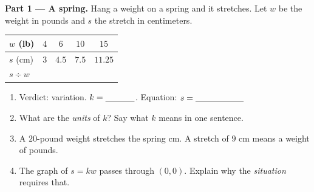 \documentclass[10pt]{article}
\begin{document}
\begin{tcolorbox}[colback=white, colframe=black!40, title=\textbf{Tier A --- Approaching Proficiency},
    fonttitle=\bfseries, arc=1.5mm, left=3mm, right=3mm, top=2mm, bottom=2mm, breakable]
\textbf{Part 1 --- A spring.} Hang a weight on a spring and it stretches. Let $w$ be the weight in
pounds and $s$ the stretch in centimeters.
\begin{center}
\renewcommand{\arraystretch}{1.3}
\begin{tabular}{|l|c|c|c|c|}
\hline
\rowcolor{forestbg}
$w$ (lb) & $4$ & $6$ & $10$ & $15$ \\ \hline
$s$ (cm) & $3$ & $4.5$ & $7.5$ & $11.25$ \\ \hline
$s\div w$ & & & & \\ \hline
\end{tabular}
\end{center}
\begin{enumerate}[label=\arabic*., leftmargin=2.1em, itemsep=5pt]
  \item Verdict: \blank{2.2cm} variation. \; $k=\blank{1.2cm}$. \; Equation: $s=\blank{2.0cm}$
  \item What are the \emph{units} of $k$? \blank{3.4cm} \; Say what $k$ means in one sentence.
        \blank{5.0cm}
  \item A $20$-pound weight stretches the spring \blank{1.6cm} cm. \; A stretch of $9$ cm means a
        weight of \blank{1.6cm} pounds.
  \item The graph of $s=kw$ passes through $(0,0)$. Explain why the \emph{situation} requires that.
        \writeline
\end{enumerate}


\end{tcolorbox}
\end{document}
